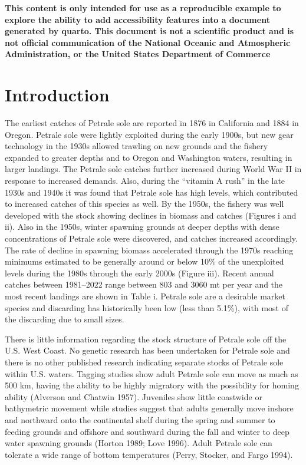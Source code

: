 \documentclass[
]{scrartcl}
\renewcommand*\contentsname{Table of contents}
\newcommand\contentsname{Table of contents}
\begin{document}
\renewcommand*\contentsname{Table of contents}
{
\hypersetup{linkcolor=}
\setcounter{tocdepth}{3}
\tableofcontents
}
\listoffigures
\listoftables

\newpage{}

\textbf{This content is only intended for use as a reproducible example
to explore the ability to add accessibility features into a document
generated by quarto. This document is not a scientific product and is
not official communication of the National Oceanic and Atmospheric
Administration, or the United States Department of Commerce}

\newpage{}

\section{Introduction}\label{sec-intro}

The earliest catches of Petrale sole are reported in 1876 in California
and 1884 in Oregon. Petrale sole were lightly exploited during the early
1900s, but new gear technology in the 1930s allowed trawling on new
grounds and the fishery expanded to greater depths and to Oregon and
Washington waters, resulting in larger landings. The Petrale sole
catches further increased during World War II in response to increased
demands. Also, during the ``vitamin A rush'' in the late 1930s and 1940s
it was found that Petrale sole has high levels, which contributed to
increased catches of this species as well. By the 1950s, the fishery was
well developed with the stock showing declines in biomass and catches
(Figures i and ii). Also in the 1950s, winter spawning grounds at deeper
depths with dense concentrations of Petrale sole were discovered, and
catches increased accordingly. The rate of decline in spawning biomass
accelerated through the 1970s reaching minimums estimated to be
generally around or below 10\% of the unexploited levels during the
1980s through the early 2000s (Figure iii). Recent annual catches
between 1981--2022 range between 803 and 3060 mt per year and the most
recent landings are shown in Table i. Petrale sole are a desirable
market species and discarding has historically been low (less than
5.1\%), with most of the discarding due to small sizes.

There is little information regarding the stock structure of Petrale
sole off the U.S. West Coast. No genetic research has been undertaken
for Petrale sole and there is no other published research indicating
separate stocks of Petrale sole within U.S. waters. Tagging studies show
adult Petrale sole can move as much as 500 km, having the ability to be
highly migratory with the possibility for homing ability (Alverson and
Chatwin 1957). Juveniles show little coastwide or bathymetric movement
while studies suggest that adults generally move inshore and northward
onto the continental shelf during the spring and summer to feeding
grounds and offshore and southward during the fall and winter to deep
water spawning grounds (Horton 1989; Love 1996). Adult Petrale sole can
tolerate a wide range of bottom temperatures (Perry, Stocker, and Fargo
1994).
\end{document}
